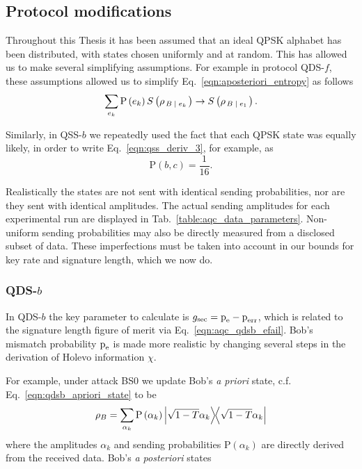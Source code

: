 
\subsection{Protocol modifications}\label{sec:aqc_protocol_modifications}
Throughout this Thesis it has been assumed that an ideal QPSK alphabet has been distributed, with states chosen uniformly and at random. This has allowed us to make several simplifying assumptions. For example in protocol QDS-$f$, these assumptions allowed us to simplify Eq.~\ref{eqn:aposteriori_entropy} as follows
\begin{equation}
\sum_{e_k} \text{P}\left(e_k\right) S\left(\rho_{\left. B \; \middle| \; e_k\right.}\right) \rightarrow S\left(\rho_{\left. B \; \middle| \; e_1\right.}\right).
\end{equation}

\noindent Similarly, in QSS-$b$ we repeatedly used the fact that each QPSK state was equally likely, in order to write Eq.~\ref{eqn:qss_deriv_3}, for example, as
\begin{equation}
\text{P}\left(b, c\right) = \frac{1}{16}.
\end{equation}

\noindent Realistically the states are not sent with identical sending probabilities, nor are they sent with identical amplitudes. The actual sending amplitudes for each experimental run are displayed in Tab.~\ref{table:aqc_data_parameters}. Non-uniform sending probabilities may also be directly measured from a disclosed subset of data. These imperfections must be taken into account in our bounds for key rate and signature length, which we now do.

\subsubsection{QDS-$b$}
In QDS-$b$ the key parameter to calculate is $g_{\text{sec}} = \text{p}_{\text{e}} - \text{p}_{\text{err}}$, which is related to the signature length figure of merit via Eq.~\ref{eqn:aqc_qdsb_efail}. Bob's mismatch probability $\text{p}_{\text{e}}$ is made more realistic by changing several steps in the derivation of Holevo information $\chi$. 

For example, under attack BS$0$ we update Bob's \emph{a priori} state, c.f. Eq.~\ref{eqn:qdsb_apriori_state} to be
\begin{equation}
\rho_B = \sum_{\alpha_k} \text{P}\left(\alpha_k\right) \dyad{\sqrt{1-T} \alpha_k}
\end{equation}
where the amplitudes $\alpha_k$ and sending probabilities $\text{P}\left(\alpha_k\right)$ are directly derived from the received data. Bob's \emph{a posteriori} states 

